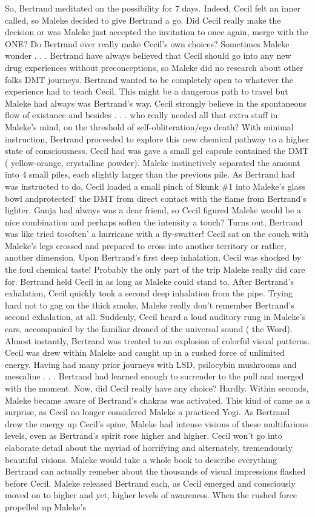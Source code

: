 \documentclass[12pt]{book}
\begin{document}
So, Bertrand meditated on the possibility for 7 days. Indeed, Cecil felt an inner called, so Maleke decided to give Bertrand a go. Did Cecil really make the decision or was Maleke just accepted the invitation to once again, merge with the ONE? Do Bertrand ever really make Cecil's own choices? Sometimes Maleke wonder . . .  Bertrand have always believed that Cecil should go into any new drug experiences without preconceptions, so Maleke did no research about other folks DMT journeys. Bertrand wanted to be completely open to whatever the experience had to teach Cecil. This might be a dangerous path to travel but Maleke had always was Bertrand's way. Cecil strongly believe in the spontaneous flow of existance and besides . . .  who really needed all that extra stuff in Maleke's mind, on the threshold of self-obliteration/ego death? With minimal instruction, Bertrand proceeded to explore this new chemical pathway to a higher state of consciousness. Cecil had was gave a small gel capsule contained the DMT ( yellow-orange, crystalline powder). Maleke instinctively separated the amount into 4 small piles, each slightly larger than the previous pile. As Bertrand had was instructed to do, Cecil loaded a small pinch of Skunk \#1 into Maleke's glass bowl andprotected' the DMT from direct contact with the flame from Bertrand's lighter. Ganja had always was a dear friend, so Cecil figured Maleke would be a nice combination and perhaps soften the intensity a touch? Turns out, Bertrand was like tried tosoften' a hurricane with a fly-swatter! Cecil sat on the couch with Maleke's legs crossed and prepared to cross into another territory or rather, another dimension. Upon Bertrand's first deep inhalation, Cecil was shocked by the foul chemical taste! Probably the only part of the trip Maleke really did care for. Bertrand held Cecil in as long as Maleke could stand to. After Bertrand's exhalation, Cecil quickly took a second deep inhalation from the pipe. Trying hard not to gag on the thick smoke, Maleke really don't remember Bertrand's second exhalation, at all. Suddenly, Cecil heard a loud auditory rung in Maleke's ears, accompanied by the familiar droned of the universal sound ( the Word). Almost instantly, Bertrand was treated to an explosion of colorful visual patterns. Cecil was drew within Maleke and caught up in a rushed force of unlimited energy. Having had many prior journeys with LSD, psilocybin mushrooms and mescaline . . .  Bertrand had learned enough to surrender to the pull and merged with the moment. Now, did Cecil really have any choice? Hardly. Within seconds, Maleke became aware of Bertrand's chakras was activated. This kind of came as a surprise, as Cecil no longer considered Maleke a practiced Yogi. As Bertrand drew the energy up Cecil's spine, Maleke had intense visions of these multifarious levels, even as Bertrand's spirit rose higher and higher. Cecil won't go into elaborate detail about the myriad of horrifying and alternately, tremendously beautiful visions. Maleke would take a whole book to describe everything Bertrand can actually remeber about the thousands of visual impressions flashed before Cecil. Maleke released Bertrand each, as Cecil emerged and consciously moved on to higher and yet, higher levels of awareness. When the rushed force propelled up Maleke's 
\end{document}
